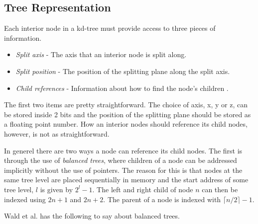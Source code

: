 \subsection{Tree Representation}

Each interior node in a kd-tree must provide access to three pieces of
information.

\begin{itemize}
\item \textit{Split axis} - The axis that an interior node is split
  along.
\item \textit{Split position} - The position of the splitting plane
  along the split axis.
\item \textit{Child references} - Information about how to find the
  node's children .
\end{itemize}

The first two items are pretty straightforward. The choice of axis, x,
y or z, can be stored inside 2 bits and the position of the splitting
plane should be stored as a floating point number. How an interior
nodes should reference its child nodes, however, is not as
straightforward.


In generel there are two ways a node can reference its child
nodes. The first is through the use of \textit{balanced trees}, where
children of a node can be addressed implicitly without the use of
pointers. The reason for this is that nodes at the same tree level are
placed sequentially in memory and the start address of some tree
level, $l$ is given by $2^l-1$. The left and right child of node $n$
can then be indexed using $2n+1$ and $2n+2$. The parent of a node is
indexed with $\lceil n/2 \rceil - 1$.


Wald et al. has the following to say about
balanced trees.



